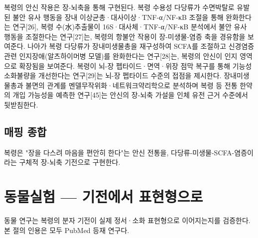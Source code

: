 \documentclass[12pt,oneside]{book}
\begin{document}
복령의 안신 작용은 장-뇌축을 통해 구현된다. 복령 수용성 다당류가 수면박탈로 유발된 불안 유사 행동을 장내 이상균총·대사이상·TNF-α/NF-κB 조절을 통해 완화한다는 연구[26], 복령 수(水)추출물이 16S·대사체·TNF-α/NF-κB 분석에서 불안 유사 행동을 조절한다는 연구[27]는, 복령의 항불안 작용이 장-미생물-염증 축을 경유함을 보여준다. 나아가 복령 다당류가 장내미생물총을 재구성하여 SCFA를 조절하고 신경염증 관련 인지장애(알츠하이머병 모델)를 완화한다는 연구[28]는, 복령의 안신이 인지 영역으로 확장됨을 보여준다. 복령이 뇌-장 펩타이드·면역·위장 점막 복구를 통해 기능성소화불량을 개선한다는 연구[29]는 뇌-장 펩타이드 수준의 접점을 제시한다. 장내미생물총과 불면의 관계를 멘델무작위화·네트워크약리학으로 분석하며 복령 등 전통 한약의 개입 가능성을 예측한 연구[45]는 안신의 장-뇌축 가설을 인체 유전 근거 수준에서 뒷받침한다.

\subsection{매핑 종합}

\vspace{2pt}\vspace{3pt}

복령은 "장을 다스려 마음을 편안히 한다"는 안신 전통을, 다당류-미생물-SCFA-염증이라는 구체적 장-뇌축 기전으로 구현한다.

\section{동물실험 — 기전에서 표현형으로}

동물 연구는 복령의 분자 기전이 실제 정서·소화 표현형으로 이어지는지를 검증한다. 본 절의 인용은 모두 PubMed 등재 연구다.
\end{document}
